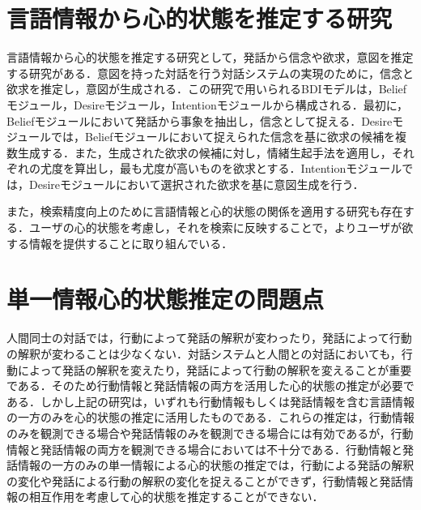 \section{言語情報から心的状態を推定する研究}
\par
言語情報から心的状態を推定する研究として，発話から信念や欲求，意図を推定する研究\cite{高橋拓誠2015bdi}がある．意図を持った対話を行う対話システムの実現のために，信念と欲求を推定し，意図が生成される．この研究で用いられるBDIモデルは，Beliefモジュール，Desireモジュール，Intentionモジュールから構成される．最初に，Beliefモジュールにおいて発話から事象を抽出し，信念として捉える．Desireモジュールでは，Beliefモジュールにおいて捉えられた信念を基に欲求の候補を複数生成する．また，生成された欲求の候補に対し，情緒生起手法\cite{2002}を適用し，それぞれの尤度を算出し，最も尤度が高いものを欲求とする．Intentionモジュールでは，Desireモジュールにおいて選択された欲求を基に意図生成を行う．

\par
また，検索精度向上のために言語情報と心的状態の関係を適用する研究\cite{10.1007/978-3-642-02481-8_4}も存在する．ユーザの心的状態を考慮し，それを検索に反映することで，よりユーザが欲する情報を提供することに取り組んでいる．


\section{単一情報心的状態推定の問題点}
\par
人間同士の対話では，行動によって発話の解釈が変わったり，発話によって行動の解釈が変わることは少なくない．対話システムと人間との対話においても，行動によって発話の解釈を変えたり，発話によって行動の解釈を変えることが重要である．そのため行動情報と発話情報の両方を活用した心的状態の推定が必要である．しかし上記の研究は，いずれも行動情報もしくは発話情報を含む言語情報の一方のみを心的状態の推定に活用したものである．これらの推定は，行動情報のみを観測できる場合や発話情報のみを観測できる場合には有効であるが，行動情報と発話情報の両方を観測できる場合においては不十分である．行動情報と発話情報の一方のみの単一情報による心的状態の推定では，行動による発話の解釈の変化や発話による行動の解釈の変化を捉えることができず，行動情報と発話情報の相互作用を考慮して心的状態を推定することができない．
